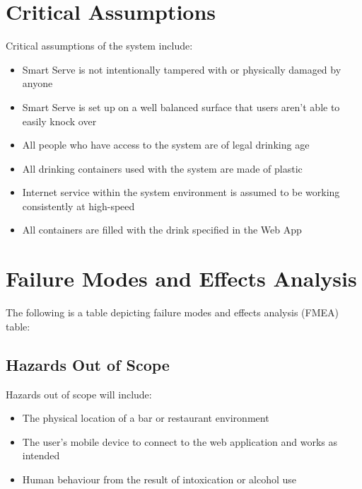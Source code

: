 \documentclass{article}
\begin{document}
\section{Critical Assumptions}
    Critical assumptions of the system include:
    \begin{itemize}
        \item Smart Serve is not intentionally tampered with or physically damaged by anyone 
        \item Smart Serve is set up on a well balanced surface that users aren't able to easily knock over
        \item All people who have access to the system are of legal drinking age 
        \item All drinking containers used with the system are made of plastic \item Internet service within the system environment is assumed to be working consistently at high-speed
        \item All containers are filled with the drink specified in the Web App
    \end{itemize}
\section{Failure Modes and Effects Analysis}
    The following is a table depicting failure modes and effects analysis (FMEA) table:
    \subsection{Hazards Out of Scope}
    Hazards out of scope will include:
    \begin{itemize}
        \item The physical location of a bar or restaurant environment
        \item The user's mobile device to connect to the web application and works as intended
        \item Human behaviour from the result of intoxication or alcohol use 
    \end{itemize}
    
\end{document}

